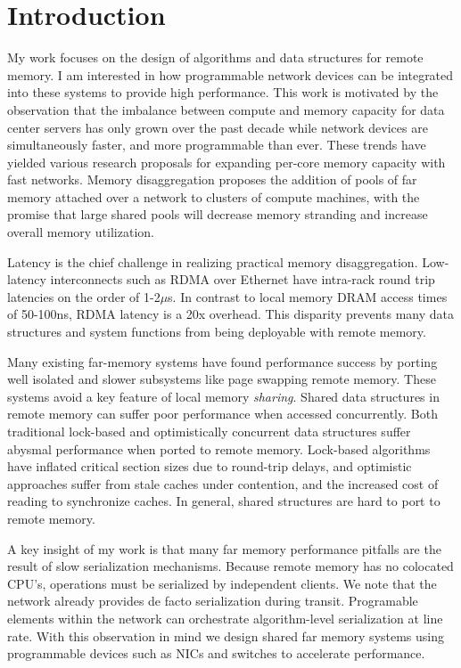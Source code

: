 
\section{Introduction}

My work focuses on the design of algorithms and data
structures for remote memory. I am interested in how
programmable network devices can be integrated into these
systems to provide high performance.
This work is motivated by the observation that the imbalance
between compute and memory capacity for data center servers
has only grown over the past decade while network devices 
are simultaneously faster, and more programmable than ever.
These trends have yielded various research proposals for
expanding per-core memory capacity with fast networks.
Memory disaggregation proposes the addition of pools of far
memory attached over a network to clusters of compute
machines, with the promise that large shared pools will
decrease memory stranding and increase overall memory
utilization.

Latency is the chief challenge in realizing practical memory
disaggregation. Low-latency interconnects such as RDMA over
Ethernet have intra-rack round trip latencies on the order
of 1-2$\mu$s.  In contrast to local memory DRAM access times
of 50-100ns, RDMA latency is a 20x overhead. This disparity
prevents many data structures and system functions from
being deployable with remote memory.

Many existing far-memory systems have found performance
success by porting well isolated and slower subsystems like
page swapping remote memory.  These systems avoid a key
feature of local memory \textit{sharing}. Shared data
structures in remote memory can suffer poor performance when
accessed concurrently.  Both traditional lock-based and
optimistically concurrent data structures suffer abysmal
performance when ported to remote memory. Lock-based
algorithms have inflated critical section sizes due to
round-trip delays, and optimistic approaches suffer from
stale caches under contention, and the increased cost of
reading to synchronize caches. In general, shared structures
are hard to port to remote memory.


A key insight of my work is that many far memory performance
pitfalls are the result of slow serialization mechanisms.
Because remote memory has no colocated CPU's, operations
must be serialized by independent clients. We note that the
network already provides de facto serialization during
transit. Programable elements within the network can
orchestrate algorithm-level serialization at line rate.
With this observation in mind we design shared far memory
systems using programmable devices such as NICs and
switches to accelerate performance.

